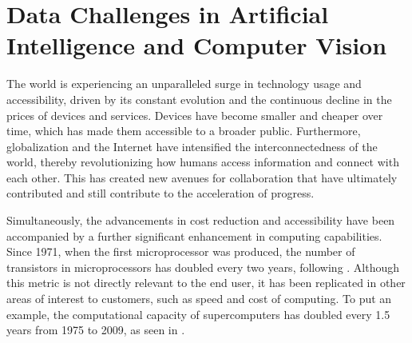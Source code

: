 
\section{Data Challenges in Artificial Intelligence and Computer Vision}

The world is experiencing an unparalleled surge in technology usage and accessibility, driven by its constant evolution and the continuous decline in the prices of devices and services. Devices have become smaller and cheaper over time, which has made them accessible to a broader public. Furthermore, globalization and the Internet have intensified the interconnectedness of the world, thereby revolutionizing how humans access information and connect with each other. This has created new avenues for collaboration that have ultimately contributed and still contribute to the acceleration of progress.


Simultaneously, the advancements in cost reduction and accessibility have been accompanied by a further significant enhancement in computing capabilities. Since 1971, when the first microprocessor was produced, the number of transistors in microprocessors has doubled every two years, following . Although this metric is not directly relevant to the end user, it has been replicated in other areas of interest to customers, such as speed and cost of computing. To put an example, the computational capacity of supercomputers has doubled every 1.5 years from 1975 to 2009, as seen in .

